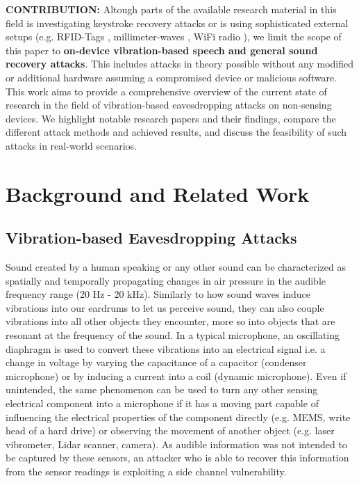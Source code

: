 \documentclass[sigconf, nonacm]{acmart}
\begin{document}
\textbf{CONTRIBUTION:} Altough parts of the available research material in this field is investigating keystroke recovery attacks \cite{Touchtone2023}\cite{TouchLogger2011}\cite{TapLogger2012} or is using sophisticated external setups (e.g. RFID-Tags \cite{RFMic2023}, millimeter-waves \cite{MMMic2022}, WiFi radio \cite{ART2015}), we limit the scope of this paper to \textbf{on-device vibration-based speech and general sound recovery attacks}.
This includes attacks in theory possible without any modified or additional hardware assuming a compromised device or malicious software.
This work aims to provide a comprehensive overview of the current state of research in the field of vibration-based eavesdropping attacks on non-sensing devices.
We highlight notable research papers and their findings, compare the different attack methods and achieved results, and discuss the feasibility of such attacks in real-world scenarios.

\section{Background and Related Work}
\subsection{Vibration-based Eavesdropping Attacks}
Sound created by a human speaking or any other sound can be characterized as spatially and temporally propagating changes in air pressure in the audible frequency range (20 Hz - 20 kHz).
Similarly to how sound waves induce vibrations into our eardrums to let us perceive sound, they can also couple vibrations into all other objects they encounter, more so into objects that are resonant at the frequency of the sound.
In a typical microphone, an oscillating diaphragm is used to convert these vibrations into an electrical signal i.e. a change in voltage by varying the capacitance of a capacitor (condenser microphone) or by inducing a current into a coil (dynamic microphone).
Even if unintended, the same phenomenon can be used to turn any other sensing electrical component into a microphone if it has a moving part capable of influencing the electrical properties of the component directly (e.g. MEMS, write head of a hard drive) or observing the movement of another object (e.g. laser vibrometer, Lidar scanner, camera).
As audible information was not intended to be captured by these sensors, an attacker who is able to recover this information from the sensor readings is exploiting a side channel vulnerability.
\end{document}
